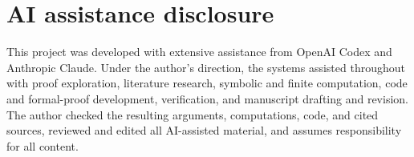 \documentclass[11pt]{article}
\theoremstyle{definition}
\theoremstyle{remark}
\begin{document}
\section*{AI assistance disclosure}

This project was developed with extensive assistance from OpenAI Codex and
Anthropic Claude. Under the author's direction, the systems assisted
throughout with proof exploration, literature research, symbolic and finite
computation, code and formal-proof development, verification, and manuscript
drafting and revision. The author checked the resulting arguments,
computations, code, and cited sources, reviewed and edited all AI-assisted
material, and assumes responsibility for all content.



\end{document}

